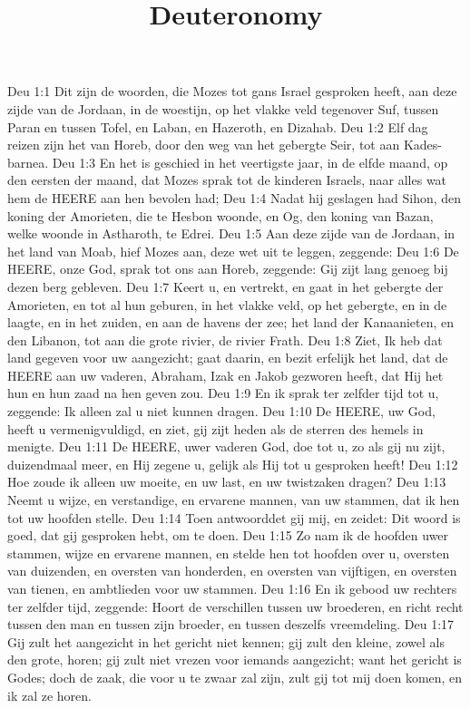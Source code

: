 

\title{Deuteronomy}


Deu 1:1  Dit zijn de woorden, die Mozes tot gans Israel gesproken heeft, aan deze zijde van de Jordaan, in de woestijn, op het vlakke veld tegenover Suf, tussen Paran en tussen Tofel, en Laban, en Hazeroth, en Dizahab.
Deu 1:2  Elf dag reizen zijn het van Horeb, door den weg van het gebergte Seir, tot aan Kades-barnea.
Deu 1:3  En het is geschied in het veertigste jaar, in de elfde maand, op den eersten der maand, dat Mozes sprak tot de kinderen Israels, naar alles wat hem de HEERE aan hen bevolen had;
Deu 1:4  Nadat hij geslagen had Sihon, den koning der Amorieten, die te Hesbon woonde, en Og, den koning van Bazan, welke woonde in Astharoth, te Edrei.
Deu 1:5  Aan deze zijde van de Jordaan, in het land van Moab, hief Mozes aan, deze wet uit te leggen, zeggende:
Deu 1:6  De HEERE, onze God, sprak tot ons aan Horeb, zeggende: Gij zijt lang genoeg bij dezen berg gebleven.
Deu 1:7  Keert u, en vertrekt, en gaat in het gebergte der Amorieten, en tot al hun geburen, in het vlakke veld, op het gebergte, en in de laagte, en in het zuiden, en aan de havens der zee; het land der Kanaanieten, en den Libanon, tot aan die grote rivier, de rivier Frath.
Deu 1:8  Ziet, Ik heb dat land gegeven voor uw aangezicht; gaat daarin, en bezit erfelijk het land, dat de HEERE aan uw vaderen, Abraham, Izak en Jakob gezworen heeft, dat Hij het hun en hun zaad na hen geven zou.
Deu 1:9  En ik sprak ter zelfder tijd tot u, zeggende: Ik alleen zal u niet kunnen dragen.
Deu 1:10  De HEERE, uw God, heeft u vermenigvuldigd, en ziet, gij zijt heden als de sterren des hemels in menigte.
Deu 1:11  De HEERE, uwer vaderen God, doe tot u, zo als gij nu zijt, duizendmaal meer, en Hij zegene u, gelijk als Hij tot u gesproken heeft!
Deu 1:12  Hoe zoude ik alleen uw moeite, en uw last, en uw twistzaken dragen?
Deu 1:13  Neemt u wijze, en verstandige, en ervarene mannen, van uw stammen, dat ik hen tot uw hoofden stelle.
Deu 1:14  Toen antwoorddet gij mij, en zeidet: Dit woord is goed, dat gij gesproken hebt, om te doen.
Deu 1:15  Zo nam ik de hoofden uwer stammen, wijze en ervarene mannen, en stelde hen tot hoofden over u, oversten van duizenden, en oversten van honderden, en oversten van vijftigen, en oversten van tienen, en ambtlieden voor uw stammen.
Deu 1:16  En ik gebood uw rechters ter zelfder tijd, zeggende: Hoort de verschillen tussen uw broederen, en richt recht tussen den man en tussen zijn broeder, en tussen deszelfs vreemdeling.
Deu 1:17  Gij zult het aangezicht in het gericht niet kennen; gij zult den kleine, zowel als den grote, horen; gij zult niet vrezen voor iemands aangezicht; want het gericht is Godes; doch de zaak, die voor u te zwaar zal zijn, zult gij tot mij doen komen, en ik zal ze horen.

